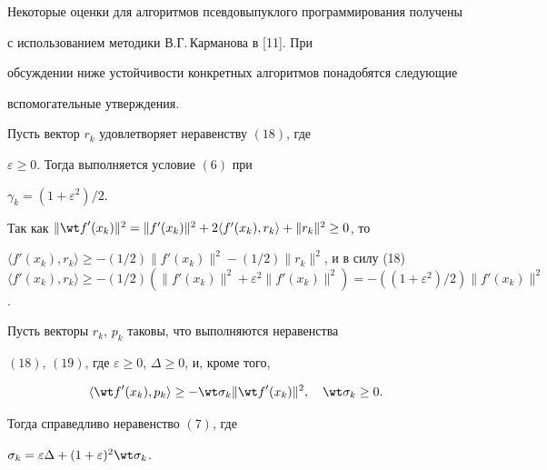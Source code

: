 Некоторые оценки для алгоритмов псевдовыпуклого программирования получены


с использованием методики В.Г.\,Карманова в [11]. При


обсуждении ниже устойчивости конкретных алгоритмов понадобятся следующие


вспомогательные утверждения.





\begin{lem}


Пусть вектор $r_k$ удовлетворяет неравенству $(18)$, где


$\varepsilon \ge 0$. Тогда выполняется условие $(6)$ при


$\gamma_k=(1+\varepsilon^2)/2$.


\end{lem}





\begin{pf}


Так как $\|{{\wt f}'(x_k)} \|^2= \|{{f}'(x_k)} \|^2+


2\langle {{f}'(x_k),r_k} \rangle + \|{r_k} \|^2\ge 0$, то


$\langle {{f}'(x_k),r_k} \rangle \ge -(1/2) \|{{f}'(x_k)} \|^2


-(1/2) \|{r_k} \|^2$, и в силу (18) $\langle {{f}'(x_k),r_k} \rangle


\ge -(1/2)(\|{{f}'(x_k)} \|^2+\varepsilon^2 \|{{f}'(x_k)} \|^2)=


-((1+\varepsilon^2)/2) \|{{f}'(x_k)} \|^2$.


\end{pf}





\begin{lem}


Пусть векторы $r_k$, $p_k$ таковы, что выполняются неравенства


$(18)$, $(19)$, где $\varepsilon \ge 0$, $\Delta \ge 0$, и, кроме того,


$$


\langle {{\wt f}'(x_k),p_k} \rangle


\ge -\wt \sigma_k \|{{\wt f}'(x_k)} \|^2,\quad \wt \sigma_k\ge0.


$$


Тогда справедливо неравенство $(7)$, где


$\sigma_k=\varepsilon \Delta +(1+\varepsilon)^2\wt \sigma_k$.


\end{lem}





